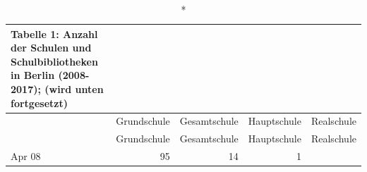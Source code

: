 \documentclass[a4paper,
fontsize=11pt,
oneside,
numbers=noperiodatend,
parskip=half-,
bibliography=totoc,
final
]{scrartcl}
\begin{document}
\begin{longtable}[]{@{}lrrrr@{}}
\caption*{Tabelle 1: Anzahl der Schulen und Schulbibliotheken in Berlin
(2008-2017); (wird unten fortgesetzt)}\tabularnewline
\toprule
\begin{minipage}[b]{0.08\columnwidth}\raggedright\strut
\strut
\end{minipage} & \begin{minipage}[b]{0.17\columnwidth}\raggedleft\strut
Grundschule\strut
\end{minipage} & \begin{minipage}[b]{0.18\columnwidth}\raggedleft\strut
Gesamtschule\strut
\end{minipage} & \begin{minipage}[b]{0.17\columnwidth}\raggedleft\strut
Hauptschule\strut
\end{minipage} & \begin{minipage}[b]{0.17\columnwidth}\raggedleft\strut
Realschule\strut
\end{minipage}\tabularnewline
\midrule
\endfirsthead
\toprule
\begin{minipage}[b]{0.08\columnwidth}\raggedright\strut
\strut
\end{minipage} & \begin{minipage}[b]{0.17\columnwidth}\raggedleft\strut
Grundschule\strut
\end{minipage} & \begin{minipage}[b]{0.18\columnwidth}\raggedleft\strut
Gesamtschule\strut
\end{minipage} & \begin{minipage}[b]{0.17\columnwidth}\raggedleft\strut
Hauptschule\strut
\end{minipage} & \begin{minipage}[b]{0.17\columnwidth}\raggedleft\strut
Realschule\strut
\end{minipage}\tabularnewline
\midrule
\endhead
\begin{minipage}[t]{0.08\columnwidth}\raggedright\strut
Apr 08\strut
\end{minipage} & \begin{minipage}[t]{0.17\columnwidth}\raggedleft\strut
95\strut
\end{minipage} & \begin{minipage}[t]{0.18\columnwidth}\raggedleft\strut
14\strut
\end{minipage} & \begin{minipage}[t]{0.17\columnwidth}\raggedleft\strut
1\strut
\end{minipage} & \begin{minipage}[t]{0.17\columnwidth}\raggedleft\strut

\end{minipage}
\end{longtable}
\end{document}
